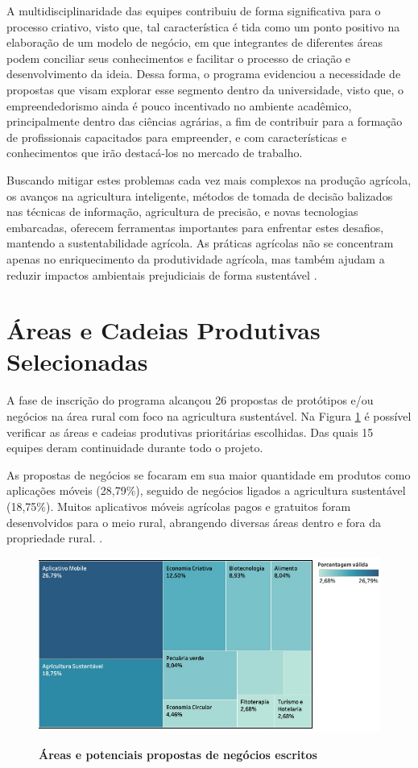 A multidisciplinaridade das equipes contribuiu de forma significativa para o processo criativo, visto que, tal característica é tida como um ponto positivo na elaboração de um modelo de negócio, em que integrantes de diferentes áreas podem conciliar seus conhecimentos e facilitar o processo de criação e desenvolvimento da ideia. Dessa forma, o programa evidenciou a necessidade de propostas que visam explorar esse segmento dentro da universidade, visto que, o empreendedorismo ainda é pouco incentivado no ambiente acadêmico, principalmente dentro das ciências agrárias, a fim de contribuir para a formação de profissionais capacitados para empreender, e com características e conhecimentos que irão destacá-los no mercado de trabalho.

Buscando mitigar estes problemas cada vez mais complexos na produção agrícola, os avanços na agricultura inteligente, métodos de tomada de decisão balizados nas técnicas de informação, agricultura de precisão, e novas tecnologias embarcadas, oferecem ferramentas importantes para enfrentar estes desafios, mantendo a sustentabilidade agrícola. As práticas agrícolas não se concentram apenas no enriquecimento da produtividade agrícola, mas também ajudam a reduzir impactos ambientais prejudiciais de forma sustentável  \cite{adnan_effects_2018,adnan_effects_2018}.

\section{Áreas e Cadeias Produtivas Selecionadas}

A fase de inscrição do programa alcançou 26 propostas de protótipos e/ou negócios na área rural com foco na agricultura sustentável. Na Figura \ref{figura_11} é possível verificar as áreas e cadeias produtivas prioritárias escolhidas. Das quais 15 equipes deram continuidade durante todo o projeto.

As propostas de negócios se focaram em sua maior quantidade em produtos como aplicações móveis (28,79\%), seguido de negócios ligados a agricultura sustentável (18,75\%). Muitos aplicativos móveis agrícolas pagos e gratuitos foram desenvolvidos para o meio rural, abrangendo diversas áreas dentro e fora da propriedade rural. \cite{silva_caracterizacao_2017}. 

\begin{figure}[H]
\centering
\caption{\textbf{Áreas e potenciais propostas de negócios escritos}}
\includegraphics[scale=0.5]{Imagens/propostas_negocios.png}
\label{figura_11}
\end{figure}

